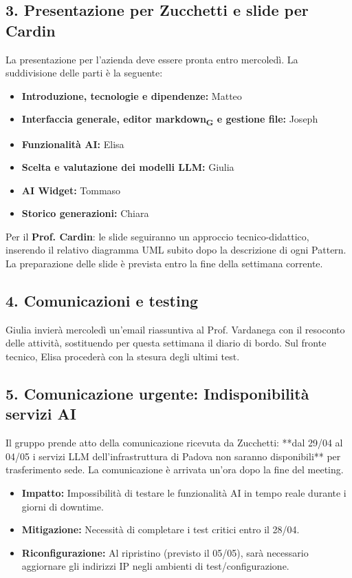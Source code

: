 \documentclass[a4paper,12pt]{article}
\newcommand{\gls}[1]{#1\textsubscript{G}}
\begin{document}
\subsection*{3. Presentazione per Zucchetti e slide per Cardin}
La presentazione per l'azienda deve essere pronta entro mercoledì. La suddivisione delle parti è la seguente:
\begin{itemize}
    \item \textbf{Introduzione, tecnologie e dipendenze:} Matteo
    \item \textbf{Interfaccia generale, editor \gls{markdown} e gestione file:} Joseph
    \item \textbf{Funzionalità AI:} Elisa
    \item \textbf{Scelta e valutazione dei modelli LLM:} Giulia
    \item \textbf{AI Widget:} Tommaso
    \item \textbf{Storico generazioni:} Chiara
\end{itemize}
Per il \textbf{Prof. Cardin}: le slide seguiranno un approccio tecnico-didattico, inserendo il relativo diagramma UML subito dopo la descrizione di ogni Pattern. La preparazione delle slide è prevista entro la fine della settimana corrente.

\subsection*{4. Comunicazioni e testing}
Giulia invierà mercoledì un'email riassuntiva al Prof. Vardanega con il resoconto delle attività, sostituendo per questa settimana il diario di bordo. Sul fronte tecnico, Elisa procederà con la stesura degli ultimi test.

\subsection*{5. Comunicazione urgente: Indisponibilità servizi AI}
Il gruppo prende atto della comunicazione ricevuta da Zucchetti: **dal 29/04 al 04/05 i servizi LLM dell'infrastruttura di Padova non saranno disponibili** per trasferimento sede. La comunicazione è arrivata un'ora dopo la fine del meeting.
\begin{itemize}
    \item \textbf{Impatto:} Impossibilità di testare le funzionalità AI in tempo reale durante i giorni di downtime.
    \item \textbf{Mitigazione:} Necessità di completare i test critici entro il 28/04.
    \item \textbf{Riconfigurazione:} Al ripristino (previsto il 05/05), sarà necessario aggiornare gli indirizzi IP negli ambienti di test/configurazione.
\end{itemize}
\end{document}
